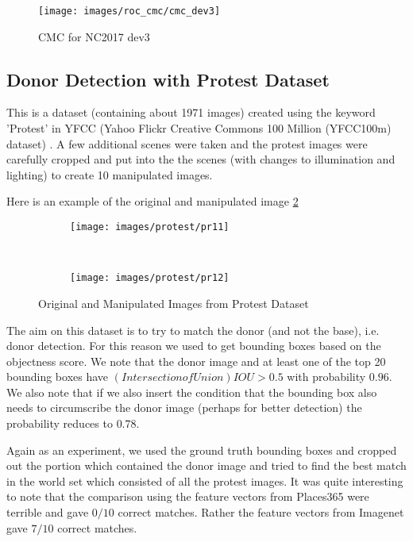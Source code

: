 \documentclass{article}
\begin{document}
\begin{figure}[H]
  \centering
  \texttt{[image: images/roc\_cmc/cmc\_dev3]}
  \caption{CMC for NC2017 dev3}
  \label{fig:cmc1}
\end{figure}

\subsection{Donor Detection with Protest Dataset}
This is a dataset (containing about 1971 images) created using the keyword 'Protest' in YFCC (Yahoo Flickr Creative Commons 100 Million (YFCC100m) dataset) \cite{DBLP:journals/corr/ThomeeSFENPBL15}. A few additional scenes were taken and the protest images were carefully cropped and put into the the scenes (with changes to illumination and lighting) to create 10 manipulated images.

Here is an example of the original and manipulated image \ref{fig:pr_imgs}
\begin{figure}[H]
  \centering
  \begin{subfigure}[H]{0.4\linewidth}
    \texttt{[image: images/protest/pr11]}
  \end{subfigure}
  ~
  \begin{subfigure}[H]{0.4\linewidth}
    \texttt{[image: images/protest/pr12]}
  \end{subfigure}
  \caption{Original and Manipulated Images from Protest Dataset}
  \label{fig:pr_imgs}
\end{figure}

The aim on this dataset is to try to match the donor (and not the base), i.e. donor detection. For this reason we used\cite{6126456} to get bounding boxes based on the objectness score. We note that the donor image and at least one of the top 20 bounding boxes have $(Intersection of Union)IOU > 0.5$ with probability $0.96$. We also note that if we also insert the condition that the bounding box also needs to circumscribe the donor image (perhaps for better detection) the probability reduces to $0.78$.

Again as an experiment, we used the ground truth bounding boxes and cropped out the portion which contained the donor image and tried to find the best match in the world set which consisted of all the protest images. It was quite interesting to note that the comparison using the feature vectors from Places365 were terrible and gave $0/10$ correct matches. Rather the feature vectors from Imagenet gave $7/10$ correct matches.
\end{document}
